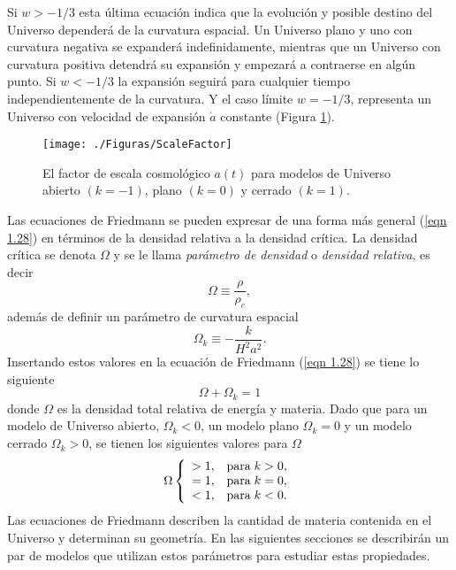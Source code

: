 \documentclass[a4paper,openright,12pt]{book}
\begin{document}
Si $w > -1/3$ esta última ecuación indica que la evolución y posible destino del Universo dependerá de la curvatura espacial. Un Universo plano y uno con curvatura negativa se expanderá indefinidamente, mientras que un Universo con curvatura positiva detendrá su expansión y empezará a contraerse en algún punto. Si $w < -1/3$ la expansión seguirá para cualquier tiempo independientemente de la curvatura. Y el caso límite $w = - 1/3$, representa un Universo con velocidad de expansión $\dot{a}$ constante (Figura \ref{fig 1.1}).
\begin{figure}
\centering
    \texttt{[image: ./Figuras/ScaleFactor]}
  \caption{\footnotesize{El factor de escala cosmológico $a(t)$ para modelos de Universo abierto $(k = -1)$, plano $(k = 0)$ y cerrado $(k = 1)$.}}
  \label{fig 1.1}
\end{figure}

Las ecuaciones de Friedmann se pueden expresar de una forma más general (\ref{eqn 1.28}) en términos de la densidad relativa a la densidad crítica. La densidad crítica se denota $\Omega$ y se le llama \textit{parámetro de densidad} o \textit{densidad relativa}, es decir
\begin{equation}
\Omega \equiv \frac{\rho}{\rho_{c}},\label{eqn 1.38}
\end{equation}
además de definir un parámetro de curvatura espacial
\begin{equation}
\Omega_{k} \equiv -\frac{k}{H^{2}a^{2}}.\label{eqn 1.39}
\end{equation}
Insertando estos valores en la ecuación de Friedmann (\ref{eqn 1.28}) se tiene lo siguiente
\begin{equation}
\Omega + \Omega_{k} = 1\label{eqn 1.40}
\end{equation}
donde $\Omega$ es la densidad total relativa de energía y materia. Dado que para un modelo de Universo abierto, $\Omega_{k} < 0$, un modelo plano $\Omega_{k} = 0 $ y un modelo cerrado $\Omega_{k} > 0$, se tienen los siguientes valores para $\Omega$
\begin{equation}
\Omega  \left\lbrace
\begin{array}{ll}
> 1, & \textup{para} \; k > 0, \\
= 1, & \textup{para} \; k = 0, \\
< 1, & \textup{para} \; k < 0. \\ \label{eqn 1.41}
\end{array}
\right.
\end{equation}
Las ecuaciones de Friedmann describen la cantidad de materia contenida en el Universo y determinan su geometría. En las siguientes secciones se describirán un par de modelos que utilizan estos parámetros para estudiar estas propiedades.
\end{document}
